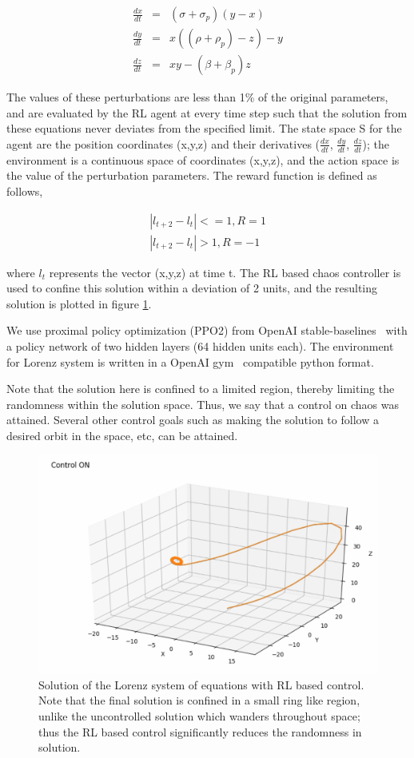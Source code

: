\documentclass[aps, pre, reprint]{revtex4-1}
\newcommand{\bea}{\begin{eqnarray}}
\newcommand{\eea}{\end{eqnarray}}
\begin{document}
\bea
\frac{dx}{dt}&=&(\sigma+\sigma_p)(y-x) \\
\frac{dy}{dt}&=&x((\rho + \rho_p) - z) - y \\
\frac{dz}{dt}&=&xy - (\beta + \beta_p)z
\eea

The values of these perturbations are less than 1\% of the original parameters, and are evaluated by the RL agent at every time step such that the solution from these equations never deviates from the specified limit. The state space S for the agent are the position coordinates (x,y,z) and their derivatives ($\frac{dx}{dt}$, $\frac{dy}{dt}$, $\frac{dz}{dt}$); the environment is a continuous space of coordinates (x,y,z), and the action space is the value of the perturbation parameters. The reward function is defined as follows,

\bea
|l_{t+2} - l_{t}| <=1, R =1 \\
|l_{t+2} - l_{t}| >1, R = -1
\eea

where $l_t$ represents the vector (x,y,z) at time t.  The RL based chaos controller is used to confine this solution within a deviation of 2 units, and the resulting solution is plotted in figure \ref{fig:on_control}. 

We use proximal policy optimization (PPO2) from OpenAI stable-baselines~\cite{stable-baselines} with a policy network of two hidden layers (64 hidden units each). The environment for Lorenz system is written in a OpenAI gym~\cite{brockman2016openai} compatible python format.

Note that the solution here is confined to a limited region, thereby limiting the randomness within the solution space. Thus, we say that a control on chaos was attained. Several other control goals such as making the solution to follow a desired orbit in the space, etc, can be attained.

\begin{figure}[ht!]
\includegraphics[scale=0.15]{ON.png}
\caption {Solution of the Lorenz system of equations with RL based control. Note that the final solution is confined in a small ring like region, unlike the uncontrolled solution which wanders throughout space; thus the RL based control significantly reduces the randomness in solution. }
\label{fig:on_control} 
\end{figure}
\end{document}
